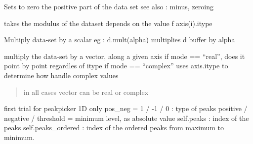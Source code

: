 \documentclass[letterpaper,10pt,openany,oneside]{sphinxmanual}
\begin{document}
\begin{fulllineitems}
\begin{fulllineitems}
\label{rst/code:NPKData.NPKData.minus}
Sets to zero the positive part of the data set
see also :  minus, zeroing

\end{fulllineitems}


\begin{fulllineitems}
\label{rst/code:NPKData.NPKData.modulus}
takes the modulus of the dataset
depends on the value f axis(i).itype

\end{fulllineitems}


\begin{fulllineitems}
\label{rst/code:NPKData.NPKData.mult}
Multiply data-set by a scalar
eg : d.mult(alpha) multiplies d buffer by alpha

\end{fulllineitems}


\begin{fulllineitems}
\label{rst/code:NPKData.NPKData.mult_by_vector}
multiply the data-set by a vector, along a given axis
if mode == ``real'', does it point by point regardles of itype
if mode == ``complex'' uses axis.itype to determine how handle complex values
\begin{quote}

in all cases vector can be real or complex
\end{quote}

\end{fulllineitems}


\begin{fulllineitems}
\label{rst/code:NPKData.NPKData.peak}
first trial for peakpicker
1D only
pos\_neg = 1 / -1 / 0   :  type of peaks positive / negative / 
threshold = minimum level, as absolute value
self.peaks : index of the peaks
self.peaks\_ordered : index of the ordered peaks from maximum to minimum.


\end{fulllineitems}
\end{fulllineitems}
\end{document}
